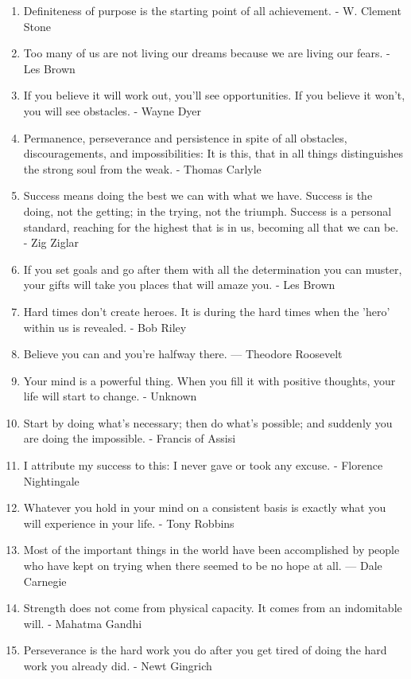 \begin{enumerate}
            \item Definiteness of purpose is the starting point of all achievement. - W. Clement Stone
            \item Too many of us are not living our dreams because we are living our fears. - Les Brown
            \item If you believe it will work out, you’ll see opportunities. If you believe it won’t, you will see obstacles. - Wayne Dyer
            \item Permanence, perseverance and persistence in spite of all obstacles, discouragements, and impossibilities: It is this, that in all things distinguishes the strong soul from the weak. - Thomas Carlyle
            \item Success means doing the best we can with what we have. Success is the doing, not the getting; in the trying, not the triumph. Success is a personal standard, reaching for the highest that is in us, becoming all that we can be. - Zig Ziglar
            \item If you set goals and go after them with all the determination you can muster, your gifts will take you places that will amaze you. - Les Brown
            \item Hard times don't create heroes. It is during the hard times when the 'hero' within us is revealed. - Bob Riley
            \item Believe you can and you’re halfway there. — Theodore Roosevelt
            \item Your mind is a powerful thing. When you fill it with positive thoughts, your life will start to change. - Unknown
            \item Start by doing what's necessary; then do what's possible; and suddenly you are doing the impossible. - Francis of Assisi
            \item I attribute my success to this: I never gave or took any excuse. - Florence Nightingale
            \item Whatever you hold in your mind on a consistent basis is exactly what you will experience in your life. - Tony Robbins
            \item Most of the important things in the world have been accomplished by people who have kept on trying when there seemed to be no hope at all. — Dale Carnegie
            \item Strength does not come from physical capacity. It comes from an indomitable will. - Mahatma Gandhi
            \item Perseverance is the hard work you do after you get tired of doing the hard work you already did. - Newt Gingrich

\end{enumerate}
